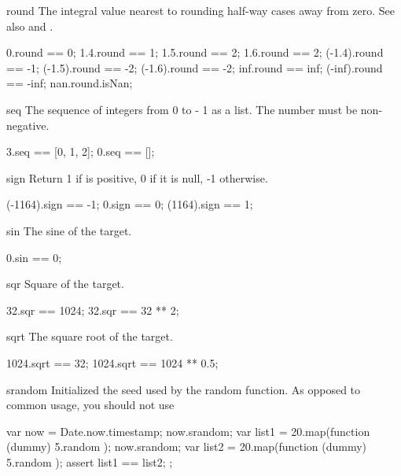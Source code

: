\begin{urbiscriptapi}
\item[round] The integral value nearest to \this rounding half-way cases
  away from zero.  See also  and .
\begin{urbiassert}
     0.round ==  0;
   1.4.round ==  1;     1.5.round ==  2;    1.6.round ==  2;
(-1.4).round == -1;  (-1.5).round == -2; (-1.6).round == -2;
   inf.round == inf; (-inf).round == -inf;
   nan.round.isNan;
\end{urbiassert}

\item[seq]
  The sequence of integers from 0 to \this - 1 as a list.
  The number must be non-negative.
\begin{urbiassert}
3.seq == [0, 1, 2];
0.seq == [];
\end{urbiassert}

\item[sign]
  Return 1 if \this is positive, 0 if it is null, -1
  otherwise.
\begin{urbiassert}
(-1164).sign == -1;
0.sign       == 0;
(1164).sign  == 1;
\end{urbiassert}

\item[sin]
  The sine of the target.
\begin{urbiassert}
0.sin == 0;
\end{urbiassert}

\item[sqr]
  Square of the target.
\begin{urbiassert}
32.sqr == 1024;
32.sqr == 32 ** 2;
\end{urbiassert}

\item[sqrt]
  The square root of the target.
\begin{urbiassert}
1024.sqrt == 32;
1024.sqrt == 1024 ** 0.5;
\end{urbiassert}

\item[srandom]
  Initialized the seed used by the random function.  As opposed to common
  usage, you should not use
\begin{urbiunchecked}
{
  var now = Date.now.timestamp;
  now.srandom;
  var list1 = 20.map(function (dummy) { 5.random });
  now.srandom;
  var list2 = 20.map(function (dummy) { 5.random });
  assert
  {
    list1 == list2;
  }
};
\end{urbiunchecked}


\end{urbiscriptapi}
